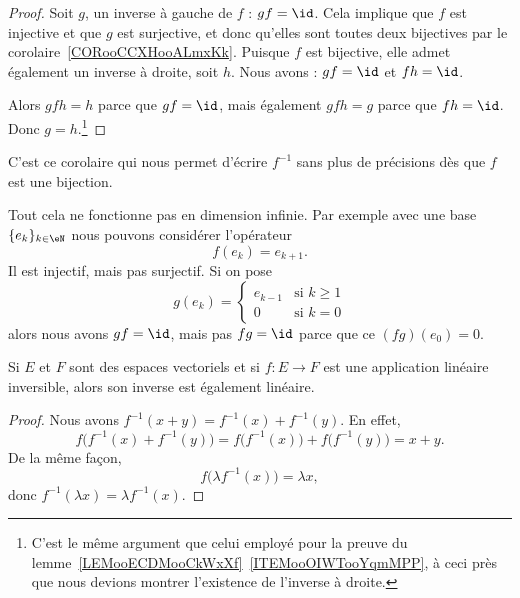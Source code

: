 \begin{proof}
	Soit \( g\), un inverse à gauche de \( f\) : \( gf=\id\). Cela implique que \( f\) est injective et que \( g\) est surjective, et donc qu'elles sont toutes deux bijectives par le corolaire~\ref{CORooCCXHooALmxKk}. Puisque \( f\) est bijective, elle admet également un inverse à droite, soit \( h\). Nous avons : \( gf=\id\) et \( fh=\id\).

	Alors \( gfh=h\) parce que \( gf=\id\), mais également \( gfh=g\) parce que \( fh=\id\). Donc \( g=h\).\footnote{C'est le même argument que celui employé pour la preuve du lemme~\ref{LEMooECDMooCkWxXf}~\ref{ITEMooOIWTooYqmMPP}, à ceci près que nous devions montrer l'existence de l'inverse à droite.}
\end{proof}
C'est ce corolaire qui nous permet d'écrire \( f^{-1}\) sans plus de précisions dès que \( f\) est une bijection.

\begin{example}
	Tout cela ne fonctionne pas en dimension infinie. Par exemple avec une base \( \{ e_k \}_{k\in \eN}\) nous pouvons considérer l'opérateur
	\begin{equation}
		f(e_k)=e_{k+1}.
	\end{equation}
	Il est injectif, mais pas surjectif. Si on pose
	\begin{equation}
		g(e_k)=\begin{cases}
			e_{k-1} & \text{si } k\geq 1 \\
			0       & \text{si } k=0
		\end{cases}
	\end{equation}
	alors nous avons \( gf=\id\), mais pas \( fg=\id\) parce que ce \( (fg)(e_0)=0\).
\end{example}

\begin{lemma}       \label{LEMooRZDTooEuLTrO}
	Si \( E\) et \( F\) sont des espaces vectoriels et si \( f\colon E\to F\) est une application linéaire inversible, alors son inverse est également linéaire.
\end{lemma}

\begin{proof}
	Nous avons \( f^{-1}(x+y)=f^{-1}(x)+f^{-1}(y)\). En effet,
	\begin{equation}
		f\big( f^{-1}(x)+f^{-1}(y) \big)=f\big( f^{-1}(x) \big)+f\big( f^{-1}(y) \big)=x+y.
	\end{equation}
	De la même façon,
	\begin{equation}
		f\big( \lambda f^{-1}(x) \big)=\lambda x,
	\end{equation}
	donc \( f^{-1}(\lambda x)=\lambda f^{-1}(x)\).
\end{proof}

